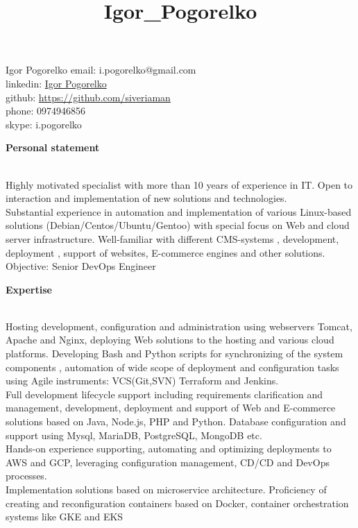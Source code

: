 \documentclass[letterpaper]{article}
\date{}
\title{Igor\_Pogorelko}
\makeatletter
\newcommand{\resheader}[6]{
    \begin{tabular*}{\textwidth}{l@{\extracolsep{\fill}}cr}
    #3 & \textbf{\LARGE #1} & #5\\
    #4 & \url{#2}           & #6\\
    \end{tabular*}
    \\
    \vspace{0.1in}
}
\renewcommand{\section}[1]{
  {
    \large \colorbox{my-gray}{
      \begin{minipage}
        {\textwidth-0.175in}
        {\textbf{#1 \vphantom{p\^{E}}}}
      \end{minipage}
    }
  }
}
\renewcommand\maketitle{}
\makeatother
\begin{document}
\maketitle
{\LARGE Igor Pogorelko} \hfill {email: i.pogorelko@gmail.com}\\
\hfill {linkedin: \href{https://www.linkedin.com/in/igor-pogorelko-a2b16941}{Igor Pogorelko}}\\
\hfill {github: \href{https://github.com/siveriaman}{https://github.com/siveriaman}}\\
\hfill {phone: 0974946856}\\
\hfill {skype: i.pogorelko}\\
\vspace*{1em plus .6em minus .5em}
\section{Personal statement}
\label{sec-1-1}
\\
Highly motivated specialist with more than 10 years of experience in IT. Open to interaction and implementation of new solutions and technologies.\\
Substantial experience in automation and implementation of various  Linux-based solutions (Debian/Centos/Ubuntu/Gentoo) with special focus on Web and cloud server infrastructure. Well-familiar with different CMS-systems , development, deployment , support  of websites, E-commerce engines and other solutions.\\
\vspace*{1em plus .6em minus .5em}
Objective: Senior DevOps Engineer\\
\section{Expertise}
\label{sec-1-1}
\\
Hosting development, configuration and administration using webservers Tomcat, Apache and Nginx, deploying Web solutions to the hosting and various cloud platforms. Developing Bash and Python scripts for synchronizing of the system components , automation of wide scope of deployment and configuration tasks using Agile instruments: VCS(Git,SVN) Terraform and Jenkins.\\
Full development lifecycle support including requirements clarification and management, development, deployment and support of Web and E-commerce solutions based on Java, Node.js, PHP and Python. Database configuration and support using Mysql, MariaDB, PostgreSQL, MongoDB etc.\\
Hands-on experience supporting, automating and optimizing deployments to AWS and GCP, leveraging configuration management, CD/CD and DevOps processes.\\
\vspace*{1em plus .6em minus .5em}
Implementation solutions based on microservice architecture. Proficiency of creating and reconfiguration containers based on Docker, container orchestration systems like GKE and EKS
\end{document}
